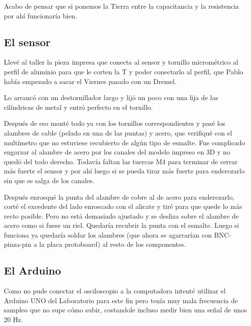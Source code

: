 Acabo de pensar que si ponemos la Tierra entre la capacitancia y la resistencia por ahí funcionaría bien.



\subsection*{El sensor}
Llevé al taller la pieza impresa que conecta al sensor y tornillo micrométrico al perfil de aluminio para que le corten la T y poder conectarlo al perfil, que Pablo había empezado a sacar el Viernes pasado con un Dremel. 

Lo arrancó con un destornillador largo y lijó un poco con una lija de las cilíndricas de metal y entró perfecto en el tornillo. 

Después de eso monté todo ya con los tornillos correspondientes y pasé los alambres de cable (pelado en una de las puntas) y acero, que verifiqué con el multímetro que no estuviese recubierto de algún tipo de esmalte. Fue complicado engarzar al alambre de acero por los canales del modelo impreso en 3D y no quedó del todo derecho. Todavía faltan las tuercas M4 para terminar de cerrar más fuerte el sensor y por ahí luego si se pueda tirar más fuerte para enderezarlo sin que se salga de los canales. %

Después enrosqué la punta del alambre de cobre al de acero para enderezarlo, corté el excedente del lado enroscado con el alicate y tiré para que quede lo más recto posible. Pero no está demasiado ajustado y se desliza sobre el alambre de acero como si fuese un riel. Quedaría recubrir la punta con el esmalte. Luego si funciona ya quedaría soldar los alambres (que ahora se agarrarían con BNC-pinza-pin a la placa protoboard) al resto de los componentes.


\subsection*{El Arduino} 
Como no pude conectar el osciloscopio a la computadora intenté utilizar el Arduino UNO del Laboratorio para este fin pero tenía muy mala frecuencia de sampleo que no supe cómo subir, costandole incluso medir bien una señal de unos 20 Hz.